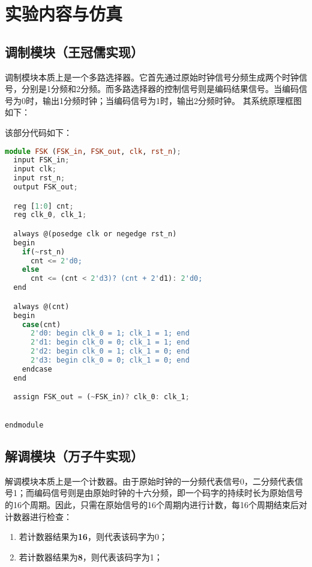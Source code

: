 \documentclass{progartcn}
\begin{document}
\section{实验内容与仿真}

\subsection{调制模块（王冠儒实现）}

调制模块本质上是一个多路选择器。它首先通过原始时钟信号分频生成两个时钟信号，分别是1分频和2分频。而多路选择器的控制信号则是编码结果信号。当编码信号为0时，输出1分频时钟；当编码信号为1时，输出2分频时钟。
其系统原理框图如下：



该部分代码如下：

\begin{lstlisting}[language=TypeScript,caption={FSK.v}]
module FSK (FSK_in, FSK_out, clk, rst_n);
  input FSK_in;
  input clk;
  input rst_n;
  output FSK_out;

  reg [1:0] cnt;
  reg clk_0, clk_1;

  always @(posedge clk or negedge rst_n)
  begin
    if(~rst_n)
      cnt <= 2'd0;
    else
      cnt <= (cnt < 2'd3)? (cnt + 2'd1): 2'd0;
  end

  always @(cnt)
  begin
    case(cnt)
      2'd0: begin clk_0 = 1; clk_1 = 1; end 
      2'd1: begin clk_0 = 0; clk_1 = 1; end
      2'd2: begin clk_0 = 1; clk_1 = 0; end
      2'd3: begin clk_0 = 0; clk_1 = 0; end
    endcase
  end

  assign FSK_out = (~FSK_in)? clk_0: clk_1;
  

endmodule
\end{lstlisting}

\subsection{解调模块（万子牛实现）}

解调模块本质上是一个计数器。由于原始时钟的一分频代表信号0，二分频代表信号1；而编码信号则是由原始时钟的十六分频，即一个码字的持续时长为原始信号的16个周期。因此，只需在原始信号的16个周期内进行计数，每16个周期结束后对计数器进行检查：
\begin{enumerate}
  \item 若计数器结果为\textbf{16}，则代表该码字为0；
  \item 若计数器结果为\textbf{8}，则代表该码字为1；
\end{enumerate}
\end{document}
